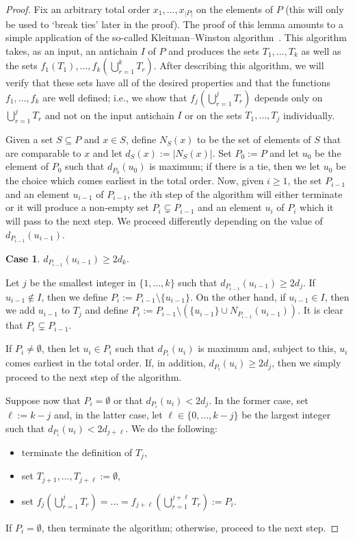 \documentclass[11 pt]{article}
\theoremstyle{definition}
\theoremstyle{case}
\newtheorem{case}{Case}
\numberwithin{equation}{section}
\begin{document}
\begin{proof}
Fix an arbitrary total order $x_1,\dots,x_{|P|}$ on the elements of $P$ (this will only be used to `break ties' later in the proof). The proof of this lemma amounts to a simple application of the so-called Kleitman--Winston algorithm~\cite{KleitmanWinston}. This algorithm takes, as an input, an antichain $I$ of $P$ and produces the sets $T_1,\dots,T_k$ as well as the sets $f_1(T_1), \dots,f_k\left(\bigcup_{r=1}^kT_r\right)$. After describing this algorithm,  we will verify that these sets have all of the desired properties and that the functions $f_1,\dots,f_k$ are well defined; i.e., we show that $f_j\left(\bigcup_{r=1}^jT_r\right)$ depends only on $\bigcup_{r=1}^jT_r$ and not on the input antichain $I$ or on the sets $T_1,\dots,T_j$ individually.

Given a set $S\subseteq P$ and $x\in S$, define $N_{S}(x)$ to be the set of elements of $S$ that are comparable to $x$ and let $d_{S}(x):=|N_{S}(x)|$. Set $P_0:=P$ and let $u_0$ be the element of $P_0$ such that $d_{P_0}(u_0)$ is maximum; if there is a tie, then we let $u_{0}$ be the choice which comes earliest in the total order. Now, given $i\geq1$, the set $P_{i-1}$ and an element $u_{i-1}$ of $P_{i-1}$, the $i$th step of the algorithm will either terminate or it will produce a non-empty set $P_i\subsetneq P_{i-1}$ and an element $u_i$ of $P_i$ which it will pass to the next step. We proceed differently depending on the value of $d_{P_{i-1}}\left(u_{i-1}\right)$.

\begin{case}
\label{bigdegcase}
$d_{P_{i-1}}(u_{i-1})\geq 2d_k$.
\end{case}

Let $j$ be the smallest integer in $\{1,\dots,k\}$ such that $d_{P_{i-1}}(u_{i-1})\geq 2d_j$. If $u_{i-1}\notin I$, then we define $P_i:=P_{i-1}\setminus\{u_{i-1}\}$. On the other hand, if $u_{i-1}\in I$, then we add $u_{i-1}$ to $T_j$ and define $P_i:=P_{i-1}\setminus\left(\{u_{i-1}\}\cup N_{P_{i-1}}(u_{i-1})\right)$. It is clear that $P_i\subsetneq P_{i-1}$.

If $P_i\neq\emptyset$, then let $u_i\in P_i$ such that $d_{P_i}(u_i)$ is maximum and, subject to this, $u_i$ comes earliest in the total order. If, in addition, $d_{P_i}(u_i)\geq 2d_j$, then we simply proceed to the next step of the algorithm. 

Suppose now that $P_i=\emptyset$ or that $d_{P_i}(u_i)< 2d_j$. In the former case, set $\ell:=k-j$ and, in the latter case, let $\ell\in\{0,\dots,k-j\}$ be the largest integer such that $d_{P_i}(u_i)<2d_{j+\ell}$. We do the following:
\begin{itemize}
\item terminate the definition of $T_j$, 
\item set $T_{j+1},\dots,T_{j+\ell}:=\emptyset$,
\item set $f_{j}\left(\bigcup_{r=1}^{j}T_r\right) =\dots =  f_{j+\ell}\left(\bigcup_{r=1}^{j+\ell}T_r\right):=P_{i}$.
\end{itemize}
If $P_i=\emptyset$, then terminate the algorithm; otherwise, proceed to the next step.


\end{proof}
\end{document}
